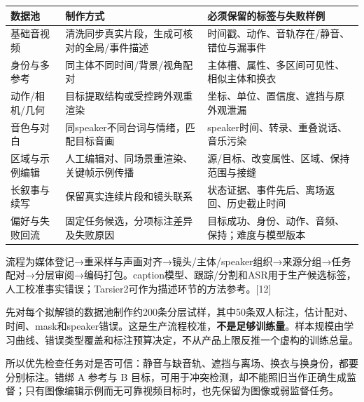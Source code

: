{\def\LTcaptype{table} %
\small\setlength{\tabcolsep}{3pt}\renewcommand{\arraystretch}{1.18}
\begin{longtable}[]{@{}
  >{\raggedright\arraybackslash}p{}
  >{\raggedright\arraybackslash}p{}
  >{\raggedright\arraybackslash}p{}@{}}
\toprule\noalign{}
\begin{minipage}[b]{\linewidth}\raggedright
数据池
\end{minipage} & \begin{minipage}[b]{\linewidth}\raggedright
制作方式
\end{minipage} & \begin{minipage}[b]{\linewidth}\raggedright
必须保留的标签与失败样例
\end{minipage} \\
\midrule\noalign{}
\endhead
\bottomrule\noalign{}
\endlastfoot
基础音视频 & 清洗同步真实片段，生成可核对的全局/事件描述 & 时间戳、动作、音轨存在/静音、错位与漏事件 \\
身份与多参考 & 同主体不同时间/背景/视角配对 & 主体槽、属性、多区间可见性、相似主体和换衣 \\
动作/相机/几何 & 目标提取结构或受控跨外观重渲染 & 坐标、单位、置信度、遮挡与原外观泄漏 \\
音色与对白 & 同speaker不同台词与情绪，匹配目标音画 & speaker时间、转录、重叠说话、音乐污染 \\
区域与示例编辑 & 人工编辑对、同场景重渲染、关键帧示例传播 & 源/目标、改变属性、区域、保持范围与接缝 \\
长叙事与续写 & 保留真实连续片段和镜头联系 & 状态证据、事件先后、离场返回、历史截止时间 \\
偏好与失败回流 & 固定任务候选，分项标注差异及失败原因 & 目标成功、身份、动作、音频、保持；难度与模型版本 \\
\end{longtable}
}

流程为媒体登记→重采样与声画对齐→镜头/主体/speaker组织→来源分组→任务配对→分层审阅→编码打包。caption模型、跟踪/分割和ASR用于生产候选标签，人工校准事实错误；Tarsier2可作为描述环节的方法参考。{[}12{]}

先对每个拟解锁的数据池制作约200条分层试样，其中50条双人标注，估计配对、时间、mask和speaker错误。这是生产流程校准，\textbf{不是足够训练量}。样本规模由学习曲线、错误类型覆盖和标注预算决定，不从产品上限反推一个虚构的训练总量。

所以优先检查任务对是否可信：静音与缺音轨、遮挡与离场、换衣与换身份，都要分别标注。错绑 A 参考与 B 目标，可用于冲突检测，却不能照旧当作正确生成监督；只有图像编辑示例而无可靠视频目标时，也先保留为图像或弱监督任务。

